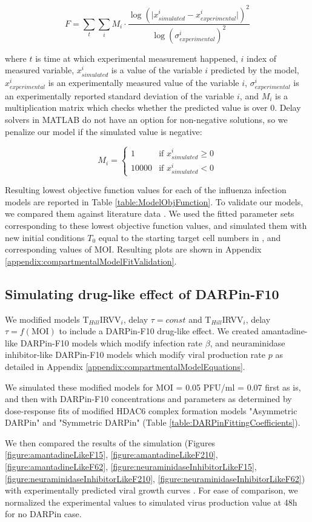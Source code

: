 \begin{equation}
F = \sum_t \sum_i M_i \cdot \frac{\log (\big| x^i_{simulated} - x^i_{experimental} \big|)^2}{\log (\sigma^i_{experimental})^2}
\end{equation}

where $t$ is time at which experimental measurement happened, $i$ index of measured variable, $x^i_{simulated}$ is a value of the variable $i$ predicted by the model, $x^i_{experimental}$ is an experimentally measured value of the variable $i$, $\sigma^i_{experimental}$ is an experimentally reported standard deviation of the variable $i$, and $M_i$ is a multiplication matrix which checks whether the predicted value is over 0. Delay solvers in MATLAB do not have an option for non-negative solutions, so we penalize our model if the simulated value is negative:

\begin{equation}
M_i =
\begin{cases}
1 & \mbox{if } x^i_{simulated} \ge 0\\
10000 & \mbox{if } x^i_{simulated} < 0
\end{cases}
\end{equation}

Resulting lowest objective function values for each of the influenza infection models are reported in Table \ref{table:ModelObjFunction}. To validate our models, we compared them against literature data \cite{schulze2009infection}. We used the fitted parameter sets corresponding to these lowest objective function values, and simulated them with new initial conditions $T_0$ equal to the starting target cell numbers in \cite{schulze2009infection}, and corresponding values of MOI. Resulting plots are shown in Appendix \ref{appendix:compartmentalModelFitValidation}.

\subsection{Simulating drug-like effect of DARPin-F10}

We modified models T$_{Hill}$IRVV$_i$, delay $\tau = const$ and T$_{Hill}$IRVV$_i$, delay $\tau = f(\text{MOI})$ to include a DARPin-F10 drug-like effect. We created amantadine-like DARPin-F10 models which modify infection rate $\beta$, and neuraminidase inhibitor-like DARPin-F10 models which modify viral production rate $p$ as detailed in Appendix \ref{appendix:compartmentalModelEquations}.

We simulated these modified models for MOI = 0.05 PFU/ml = 0.07 first as is, and then with DARPin-F10 concentrations and parameters as determined by dose-response fits of modified HDAC6 complex formation models "Asymmetric DARPin" and "Symmetric DARPin" (Table \ref{table:DARPinFittingCoefficients}).

We then compared the results of the simulation (Figures \ref{figure:amantadineLikeF15}, \ref{figure:amantadineLikeF210}, \ref{figure:amantadineLikeF62}, \ref{figure:neuraminidaseInhibitorLikeF15}, \ref{figure:neuraminidaseInhibitorLikeF210}, \ref{figure:neuraminidaseInhibitorLikeF62}) with experimentally predicted viral growth curves \cite{DarpinData}. For ease of comparison, we normalized the experimental values to simulated virus production value at 48h for no DARPin case.